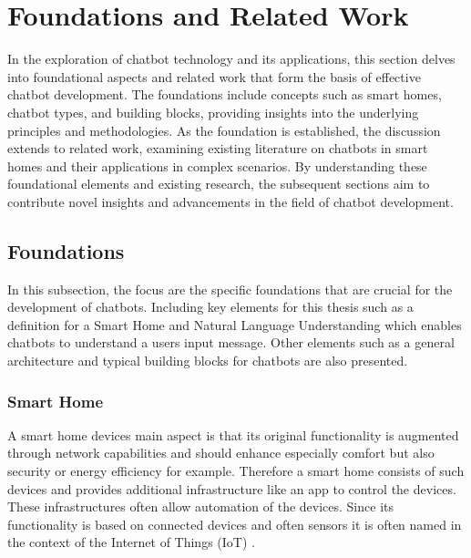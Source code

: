 
\chapter{Foundations and Related Work}
\label{chap:ch2}
\label{chap:foundation}

In the exploration of chatbot technology and its applications, this section delves into foundational aspects and related work that form the basis of effective chatbot development. 
The foundations include concepts such as smart homes, chatbot types, and building blocks, providing insights into the underlying principles and methodologies. 
As the foundation is established, the discussion extends to related work, examining existing literature on chatbots in smart homes and their applications in complex scenarios. 
By understanding these foundational elements and existing research, the subsequent sections aim to contribute novel insights and advancements in the field of chatbot development.

\section{Foundations}
\label{sec:foundation}
In this subsection, the focus are the specific foundations that are crucial for the development of chatbots.
Including key elements for this thesis such as a definition for a Smart Home and Natural Language Understanding which enables chatbots to understand a users input message.
Other elements such as a general architecture and typical building blocks for chatbots are also presented.

\subsection*{Smart Home} 
A smart home devices main aspect is that its original functionality is augmented through network capabilities \cite{schiefer_smart_2015,balakrishnan_smart_2018} and should enhance especially comfort\cite{matsui_information_2018, balakrishnan_smart_2018} but also security\cite{balakrishnan_smart_2018} or energy efficiency\cite{matsui_information_2018, balakrishnan_smart_2018} for example. 
Therefore a smart home consists of such devices and provides additional infrastructure like an app to control the devices. 
These infrastructures often allow automation of the devices.
Since its functionality is based on connected devices and often sensors it is often named in the context of the Internet of Things (IoT) \cite{atzori_internet_2010}. 

